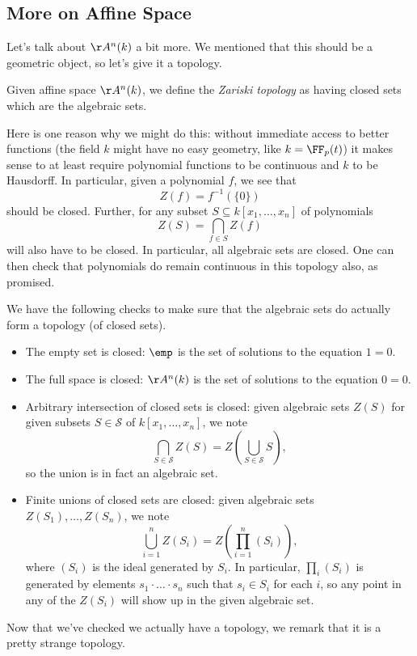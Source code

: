 \subsection{More on Affine Space}
Let's talk about $\AA^n(k)$ a bit more. We mentioned that this should be a geometric object, so let's give it a topology.
\begin{definition}
	Given affine space $\AA^n(k)$, we define the \textit{Zariski topology} as having closed sets which are the algebraic sets.
\end{definition}
\begin{remark}[Nir]
	Here is one reason why we might do this: without immediate access to better functions (the field $k$ might have no easy geometry, like $k=\FF_p(t)$) it makes sense to at least require polynomial functions to be continuous and $k$ to be Hausdorff. In particular, given a polynomial $f$, we see that
	\[Z(f)=f^{-1}(\{0\})\]
	should be closed. Further, for any subset $S\subseteq k[x_1,\ldots,x_n]$ of polynomials
	\[Z(S)=\bigcap_{f\in S}Z(f)\]
	will also have to be closed. In particular, all algebraic sets are closed. One can then check that polynomials do remain continuous in this topology also, as promised.
\end{remark}
We have the following checks to make sure that the algebraic sets do actually form a topology (of closed sets).
\begin{itemize}
	\item The empty set is closed: $\emp$ is the set of solutions to the equation $1=0$.
	\item The full space is closed: $\AA^n(k)$ is the set of solutions to the equation $0=0$.
	\item Arbitrary intersection of closed sets is closed: given algebraic sets $Z(S)$ for given subsets $S\in\mathcal S$ of $k[x_1,\ldots,x_n]$, we note
	\[\bigcap_{S\in\mathcal S}Z(S)=Z\left(\bigcup_{S\in\mathcal S}S\right),\]
	so the union is in fact an algebraic set.
	\item Finite unions of closed sets are closed: given algebraic sets $Z(S_1),\ldots,Z(S_n)$, we note
	\[\bigcup_{i=1}^nZ(S_i)=Z\left(\prod_{i=1}^n(S_i)\right),\]
	where $(S_i)$ is the ideal generated by $S_i$. In particular, $\prod_i(S_i)$ is generated by elements $s_1\cdot\ldots\cdot s_n$ such that $s_i\in S_i$ for each $i$, so any point in any of the $Z(S_i)$ will show up in the given algebraic set.
\end{itemize}
Now that we've checked we actually have a topology, we remark that it is a pretty strange topology.
